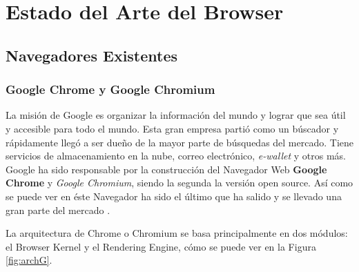 \chapter{Estado del Arte del Browser} %
\label{chap3:EA}

\section{Navegadores Existentes}
\label{chap3:BrowExis}

    \subsection{Google Chrome y Google Chromium}
    \label{chap3:GC}
    La misión de Google es organizar la información del mundo y lograr que sea útil y accesible para todo el mundo. Esta gran empresa partió como un búscador y rápidamente llegó a ser dueño de la mayor parte de búsquedas del mercado. Tiene servicios de almacenamiento en la nube, correo electrónico, \textit{e-wallet} y otros más. Google ha sido responsable por la construcción del Navegador Web \textbf{Google Chrome} y \textit{Google Chromium}, siendo la segunda la versión open source. Así como se puede ver en \cite{EvolutionofWeb} éste Navegador ha sido el último que ha salido y se llevado una gran parte del mercado \cite{statBrow}.

    La arquitectura de Chrome o Chromium se basa principalmente en dos módulos: el Browser Kernel y el Rendering Engine, cómo se puede ver en la Figura \ref{fig:archG}.

